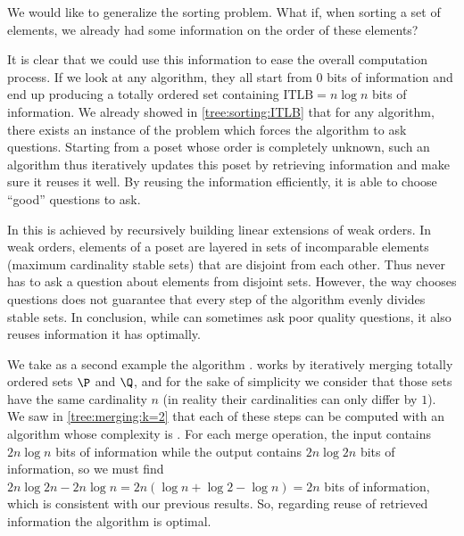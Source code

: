 
We would like to generalize the sorting problem. What if, when sorting a set of
elements, we already had some information on the order of these elements?


It is clear that we could use this information to ease the overall computation
process. If we look at any  algorithm, they all start from
$0$ bits of information and end up producing a totally ordered set containing
$\text{ITLB}= n \log n$ bits of information. We already showed in
\ref{tree:sorting:ITLB} that for any algorithm, there exists an instance of the
problem which forces the algorithm to ask  questions.
Starting from a poset whose order is completely unknown, such an algorithm
thus iteratively updates this poset by retrieving information and make sure it
reuses it well. By reusing the information efficiently, it is able to
choose ``good'' questions to ask.


In \quicksort this is achieved by recursively building linear extensions of weak
orders. In weak orders, elements of a poset are layered in sets of incomparable
elements (maximum cardinality stable sets) that are disjoint from each other.
Thus \quicksort never has to ask a question about elements from disjoint
sets. However, the way \quicksort chooses questions does not guarantee that every
step of the algorithm evenly divides stable sets. In conclusion, while
\quicksort can sometimes ask poor quality questions, it also reuses information
it has optimally.


We take as a second example the algorithm \mergesort. \mergesort works by
iteratively merging totally ordered sets $\P$ and $\Q$, and for the sake of
simplicity we consider that those sets have the same cardinality $n$  (in
reality their cardinalities can only differ by $1$). We saw in
\ref{tree:merging:k=2} that each of these steps can be computed with an
algorithm whose complexity is . For each merge operation, the input
contains $2n \log n$ bits of information while the output contains $2n \log 2n$
bits of information, so we must find $2n \log 2n - 2n \log n = 2n (\log n +
\log 2 - \log n) = 2n$ bits of information, which is consistent with our
previous results. So, regarding reuse of retrieved information the \mergesort
algorithm is optimal.

